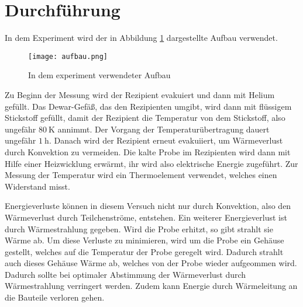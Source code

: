 \section{Durchführung}

In dem Experiment wird der in Abbildung \ref{fig:aufbau} dargestellte Aufbau
verwendet.

\begin{figure}[H]
  \centering
  \texttt{[image: aufbau.png]}
  \caption{In dem experiment verwendeter Aufbau}
  \label{fig:aufbau}
\end{figure}

Zu Beginn der Messung wird der Rezipient evakuiert und dann mit Helium gefüllt.
Das Dewar-Gefäß, das den Rezipienten umgibt, wird dann mit flüssigem
Stickstoff gefüllt, damit der Rezipient die Temperatur von dem Stickstoff, also
ungefähr $\SI{80}{\kelvin}$ annimmt. Der Vorgang der Temperaturübertragung
dauert ungefähr $\SI{1}{\hour}$. Danach wird der Rezipient erneut evakuiiert,
um Wärmeverlust durch Konvektion zu vermeiden. Die kalte Probe im Rezipienten
wird dann mit Hilfe einer Heizwicklung erwärmt, ihr wird also elektrische
Energie zugeführt. Zur Messung der Temperatur wird ein Thermoelement verwendet,
welches einen Widerstand misst.

Energieverluste können in diesem Versuch nicht nur durch Konvektion, also
den Wärmeverlust durch Teilchenströme, entstehen. Ein weiterer Energieverlust
ist durch Wärmestrahlung gegeben. Wird die Probe erhitzt, so gibt strahlt sie
Wärme ab. Um diese Verluste zu minimieren, wird um die Probe ein Gehäuse
gestellt, welches auf die Temperatur der Probe geregelt wird. Dadurch strahlt
auch dieses Gehäuse Wärme ab, welches von der Probe wieder aufgeommen wird.
Dadurch sollte bei optimaler Abstimmung der Wärmeverlust durch Wärmestrahlung
verringert werden. Zudem kann Energie durch Wärmeleitung an die Bauteile
verloren gehen.
